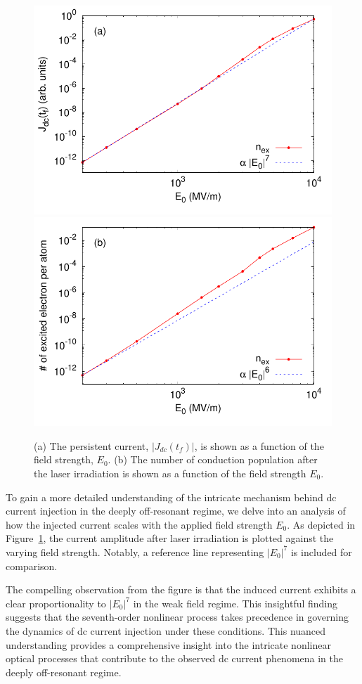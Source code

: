 \begin{figure}[htbp]
\centering
\includegraphics[width=0.80\linewidth]{pic/dc_current_vs_E0.pdf}
\includegraphics[width=0.80\linewidth]{pic/nex_vs_E0.pdf}
\caption{\label{fig:dc_current_vs_E0} 
(a) The persistent current, $|J_{dc}(t_f)|$, is shown as a function of the field strength, $E_0$. (b) The number of conduction population after the laser irradiation is shown as a function of the field strength $E_0$.
}
\end{figure}
To gain a more detailed understanding of the intricate mechanism behind dc current injection in the deeply off-resonant regime, we delve into an analysis of how the injected current scales with the applied field strength $E_0$. As depicted in Figure~\ref{fig:dc_current_vs_E0}, the current amplitude after laser irradiation is plotted against the varying field strength. Notably, a reference line representing $|E_0|^7$ is included for comparison.

The compelling observation from the figure is that the induced current exhibits a clear proportionality to $|E_0|^7$ in the weak field regime. This insightful finding suggests that the seventh-order nonlinear process takes precedence in governing the dynamics of dc current injection under these conditions. This nuanced understanding provides a comprehensive insight into the intricate nonlinear optical processes that contribute to the observed dc current phenomena in the deeply off-resonant regime.

